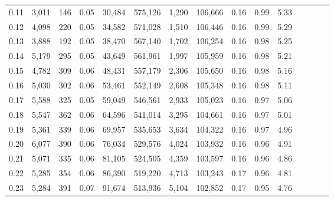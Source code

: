 \begin{tabular}{rrrcrrrrrrrrrrr}
0.11 &   3,011 &    146 &                                       0.05 &   30,484 &  575,126 &    1,290 &  106,666 &  0.16 &  0.99 &                         5.33 \\
0.12 &   4,098 &    220 &                                       0.05 &   34,582 &  571,028 &    1,510 &  106,446 &  0.16 &  0.99 &                         5.29 \\
0.13 &   3,888 &    192 &                                       0.05 &   38,470 &  567,140 &    1,702 &  106,254 &  0.16 &  0.98 &                         5.25 \\
0.14 &   5,179 &    295 &                                       0.05 &   43,649 &  561,961 &    1,997 &  105,959 &  0.16 &  0.98 &                         5.21 \\
0.15 &   4,782 &    309 &                                       0.06 &   48,431 &  557,179 &    2,306 &  105,650 &  0.16 &  0.98 &                         5.16 \\
0.16 &   5,030 &    302 &                                       0.06 &   53,461 &  552,149 &    2,608 &  105,348 &  0.16 &  0.98 &                         5.11 \\
0.17 &   5,588 &    325 &                                       0.05 &   59,049 &  546,561 &    2,933 &  105,023 &  0.16 &  0.97 &                         5.06 \\
0.18 &   5,547 &    362 &                                       0.06 &   64,596 &  541,014 &    3,295 &  104,661 &  0.16 &  0.97 &                         5.01 \\
0.19 &   5,361 &    339 &                                       0.06 &   69,957 &  535,653 &    3,634 &  104,322 &  0.16 &  0.97 &                         4.96 \\
0.20 &   6,077 &    390 &                                       0.06 &   76,034 &  529,576 &    4,024 &  103,932 &  0.16 &  0.96 &                         4.91 \\
0.21 &   5,071 &    335 &                                       0.06 &   81,105 &  524,505 &    4,359 &  103,597 &  0.16 &  0.96 &                         4.86 \\
0.22 &   5,285 &    354 &                                       0.06 &   86,390 &  519,220 &    4,713 &  103,243 &  0.17 &  0.96 &                         4.81 \\
0.23 &   5,284 &    391 &                                       0.07 &   91,674 &  513,936 &    5,104 &  102,852 &  0.17 &  0.95 &                         4.76 \\

\end{tabular}
